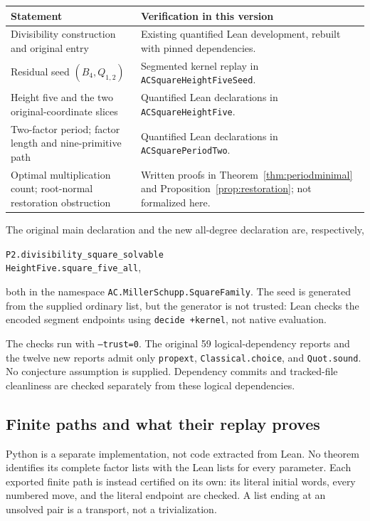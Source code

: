 \documentclass[11pt]{article}
\theoremstyle{definition}\newtheorem{definition}[theorem]{Definition}
\theoremstyle{remark}\newtheorem{remark}[theorem]{Remark}
\begin{document}
\begin{center}
\small
\begin{tabular}{@{}p{.36\linewidth}p{.55\linewidth}@{}}
\toprule
Statement & Verification in this version\\
\midrule
Divisibility construction and original entry & Existing quantified Lean development, rebuilt with pinned dependencies.\\
Residual seed $(B_4,Q_{1,2})$ & Segmented kernel replay in \texttt{ACSquareHeightFiveSeed}.\\
Height five and the two original-coordinate slices & Quantified Lean declarations in \texttt{ACSquareHeightFive}.\\
Two-factor period; factor length and nine-primitive path & Quantified Lean declarations in \texttt{ACSquarePeriodTwo}.\\
Optimal multiplication count; root-normal restoration obstruction & Written proofs in Theorem~\ref{thm:periodminimal} and Proposition~\ref{prop:restoration}; not formalized here.\\
\bottomrule
\end{tabular}
\end{center}

The original main declaration and the new all-degree declaration are, respectively,
\begin{center}\small
\texttt{P2.divisibility\_square\_solvable}\\
\texttt{HeightFive.square\_five\_all},
\end{center}
both in the namespace \texttt{AC.MillerSchupp.SquareFamily}. The seed is generated from the supplied ordinary list, but the generator is not trusted: Lean checks the encoded segment endpoints using \texttt{decide +kernel}, not native evaluation.

The checks run with \texttt{--trust=0}. The original 59 logical-dependency reports and the twelve new reports admit only \texttt{propext}, \texttt{Classical.choice}, and \texttt{Quot.sound}. No conjecture assumption is supplied. Dependency commits and tracked-file cleanliness are checked separately from these logical dependencies.

\subsection{Finite paths and what their replay proves}
Python is a separate implementation, not code extracted from Lean. No theorem identifies its complete factor lists with the Lean lists for every parameter. Each exported finite path is instead certified on its own: its literal initial words, every numbered move, and the literal endpoint are checked. A list ending at an unsolved pair is a transport, not a trivialization.
\end{document}
